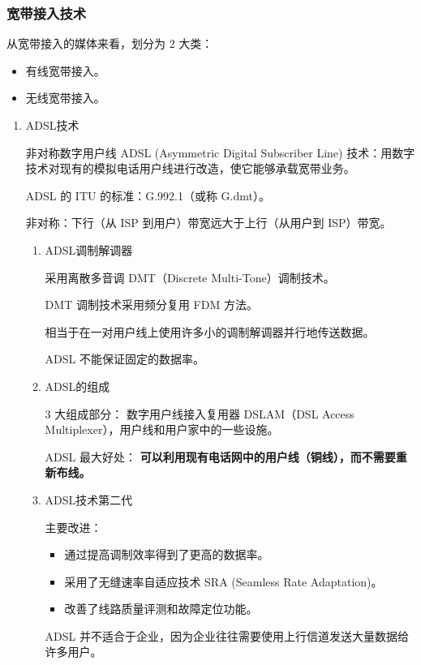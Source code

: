\documentclass[11pt]{article}
\begin{document}
\subsubsection{宽带接入技术}
\label{sec:org9b609ac}

从宽带接入的媒体来看，划分为 2 大类：
\begin{itemize}
\item 有线宽带接入。
\item 无线宽带接入。
\end{itemize}

\begin{enumerate}
\item ADSL技术
\label{sec:orge79f572}

非对称数字用户线 ADSL (Asymmetric Digital Subscriber Line) 技术：用数字技术对现有的模拟电话用户线进行改造，使它能够承载宽带业务。

ADSL 的 ITU 的标准：G.992.1（或称 G.dmt）。

非对称：下行（从 ISP 到用户）带宽远大于上行（从用户到 ISP）带宽。

\begin{enumerate}
\item ADSL调制解调器
\label{sec:orgfa6e286}

采用离散多音调 DMT（Discrete Multi-Tone）调制技术。

DMT 调制技术采用频分复用 FDM 方法。

相当于在一对用户线上使用许多小的调制解调器并行地传送数据。

ADSL 不能保证固定的数据率。

\item ADSL的组成
\label{sec:orgeb5cc41}

3 大组成部分：
数字用户线接入复用器 DSLAM（DSL Access Multiplexer），用户线和用户家中的一些设施。

ADSL 最大好处： \textbf{可以利用现有电话网中的用户线（铜线），而不需要重新布线。}

\item ADSL技术第二代
\label{sec:orgaf8bfd3}

主要改进：
\begin{itemize}
\item 通过提高调制效率得到了更高的数据率。
\item 采用了无缝速率自适应技术 SRA (Seamless Rate Adaptation)。
\item 改善了线路质量评测和故障定位功能。
\end{itemize}

ADSL 并不适合于企业，因为企业往往需要使用上行信道发送大量数据给许多用户。
\end{enumerate}


\end{enumerate}
\end{document}

